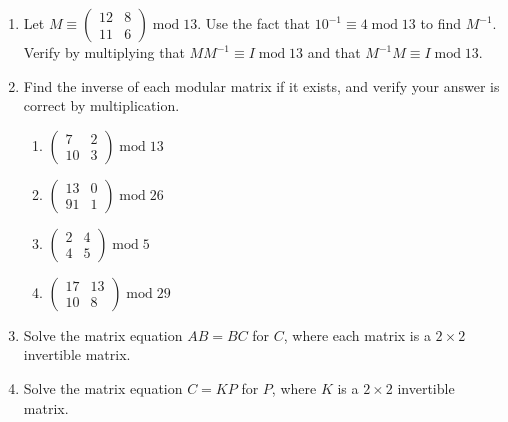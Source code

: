 \documentclass{book}
\theoremstyle{plain}
\theoremstyle{definition}
\newif\ifprintsolutions
\newcommand{\solution}[1]{\ifprintsolutions \begin{sloppypar}{\it #1}\end{sloppypar} \fi} %
\renewcommand{\mod}{\operatorname{mod}}
\renewcommand{\mod}{\operatorname{mod}}
\begin{document}
\begin{enumerate}
\item Let $M \equiv \begin{pmatrix} 12 & 8 \\ 11 & 6 \end{pmatrix} \mod 13$. Use the fact that $10^{-1} \equiv 4 \mod 13$ to find $M^{-1}$. Verify by multiplying that $MM^{-1} \equiv I \mod 13$ and that $M^{-1}M \equiv I \mod 13$. \solution{The inverse is $\begin{pmatrix} 11 & 7 \\ 8 & 9 \end{pmatrix} \mod 13$.}
\item Find the inverse of each modular matrix if it exists, and verify your answer is correct by multiplication.
\begin{enumerate}
\item $\begin{pmatrix} 7 & 2 \\ 10 & 3 \end{pmatrix} \mod 13$ \solution{The inverse is $\begin{pmatrix} 3 & 11 \\ 3 & 7 \end{pmatrix} \mod 13$.}
\item $\begin{pmatrix} 13 & 0 \\ 91 & 1 \end{pmatrix} \mod 26$ \solution{Not invertible}
\item $\begin{pmatrix} 2 & 4 \\ 4 & 5 \end{pmatrix} \mod 5$ \solution{The inverse is $\begin{pmatrix} 0 & 4 \\ 4 & 3 \end{pmatrix} \mod 5$.}
\item $\begin{pmatrix} 17 & 13 \\ 10 & 8 \end{pmatrix} \mod 29$ \solution{The inverse is $\begin{pmatrix} 11 & 22 \\ 8 & 27 \end{pmatrix} \mod 29$.}
\end{enumerate}
\item Solve the matrix equation $AB = BC$ for $C$, where each matrix is a $2 \times 2$ invertible matrix. \solution{$C = B^{-1}AB$}
\item Solve the matrix equation $C = KP$ for $P$, where $K$ is a $2 \times 2$ invertible matrix. \solution{$P = K^{-1}C$}

\end{enumerate}
\end{document}
